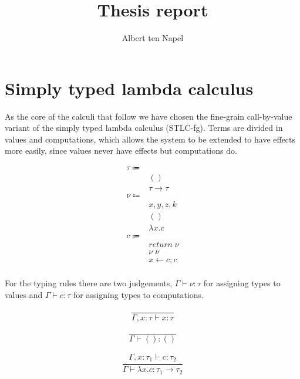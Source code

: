 \documentclass[12pt]{article}
\title{Thesis report}
\author{Albert ten Napel}
\date{}
\newcommand\type[0]{\tau}
\newcommand\tunit[0]{()}
\newcommand\tarr[2]{#1 \rightarrow #2}
\newcommand\val[0]{\nu}
\newcommand\vunit[0]{()}
\newcommand\vabs[2]{\lambda #1 . #2}
\newcommand\comp[0]{c}
\newcommand\creturn[1]{\textit{return} \; #1}
\newcommand\capp[2]{#1 \; #2}
\newcommand\cdo[3]{#1 \leftarrow #2 ; #3}
\begin{document}
\maketitle

\section{Simply typed lambda calculus}

As the core of the calculi that follow we have chosen the fine-grain call-by-value\cite{finegrain} variant of the simply typed lambda calculus (STLC-fg). Terms are divided in values and computations, which allows the system to be extended to have effects more easily, since values never have effects but computations do.

\begin{align*}
	\type \Coloneqq 	& 							\tag{value types} \\
				& \tunit						\tag{unit type} \\
				& \tarr{\type}{\type}				\tag{type of functions} \\
	\val \Coloneqq	&							\tag{values} \\
				& x, y, z, k						\tag{variables} \\
				& \vunit						\tag{unit value} \\
				& \vabs{x}{\comp}					\tag{abstraction} \\
	\comp \Coloneqq	&							\tag{computations} \\
				& \creturn{\val}					\tag{return value as computation} \\
				& \capp{\val}{\val}					\tag{application} \\
				& \cdo{x}{\comp}{\comp}				\tag{sequencing} \\
\end{align*}

\newpage
For the typing rules there are two judgements,
$\Gamma \vdash \val : \type$ for assigning types to values and $\Gamma \vdash \comp : \type$ for assigning types to computations.

\begin{minipage}{0.33\textwidth}
	\[\frac{
	}{
		\Gamma, x : \type \vdash x : \type
	}\]
\end{minipage}
\begin{minipage}{0.33\textwidth}
	\[\frac{
	}{
		\Gamma \vdash \vunit : \tunit
	}\]
\end{minipage}
\begin{minipage}{0.33\textwidth}
\[\frac{
	\begin{array}{l}
	\Gamma, x : \type_1 \vdash \comp : \type_2
	\end{array}
}{
	\Gamma \vdash \vabs{x}{\comp} : \tarr{\type_1}{\type_2}
}\]
\end{minipage}
\end{document}
